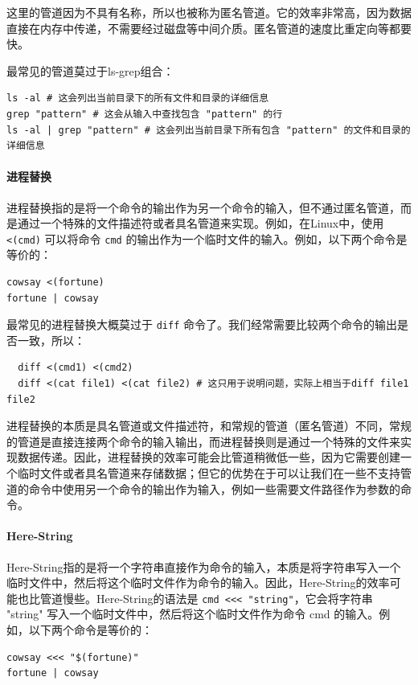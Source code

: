 这里的管道因为不具有名称，所以也被称为匿名管道。它的效率非常高，因为数据直接在内存中传递，不需要经过磁盘等中间介质。匿名管道的速度比重定向等都要快。

最常见的管道莫过于ls-grep组合：
\begin{verbatim}
ls -al # 这会列出当前目录下的所有文件和目录的详细信息
grep "pattern" # 这会从输入中查找包含 "pattern" 的行
ls -al | grep "pattern" # 这会列出当前目录下所有包含 "pattern" 的文件和目录的详细信息
\end{verbatim}

\paragraph{进程替换} 进程替换指的是将一个命令的输出作为另一个命令的输入，但不通过匿名管道，而是通过一个特殊的文件描述符或者具名管道来实现。例如，在Linux中，使用 \texttt{<(cmd)} 可以将命令 \texttt{cmd} 的输出作为一个临时文件的输入。例如，以下两个命令是等价的：
\begin{verbatim}
cowsay <(fortune)
fortune | cowsay
\end{verbatim}

最常见的进程替换大概莫过于 \texttt{diff} 命令了。我们经常需要比较两个命令的输出是否一致，所以：
\begin{verbatim}
  diff <(cmd1) <(cmd2)
  diff <(cat file1) <(cat file2) # 这只用于说明问题，实际上相当于diff file1 file2
\end{verbatim}

进程替换的本质是具名管道或文件描述符，和常规的管道（匿名管道）不同，常规的管道是直接连接两个命令的输入输出，而进程替换则是通过一个特殊的文件来实现数据传递。因此，进程替换的效率可能会比管道稍微低一些，因为它需要创建一个临时文件或者具名管道来存储数据；但它的优势在于可以让我们在一些不支持管道的命令中使用另一个命令的输出作为输入，例如一些需要文件路径作为参数的命令。

\paragraph{Here-String} Here-String指的是将一个字符串直接作为命令的输入，本质是将字符串写入一个临时文件中，然后将这个临时文件作为命令的输入。因此，Here-String的效率可能也比管道慢些。Here-String的语法是 \texttt{cmd <<< "string"}，它会将字符串 "string" 写入一个临时文件中，然后将这个临时文件作为命令 cmd 的输入。例如，以下两个命令是等价的：
\begin{verbatim}
cowsay <<< "$(fortune)"
fortune | cowsay
\end{verbatim}

